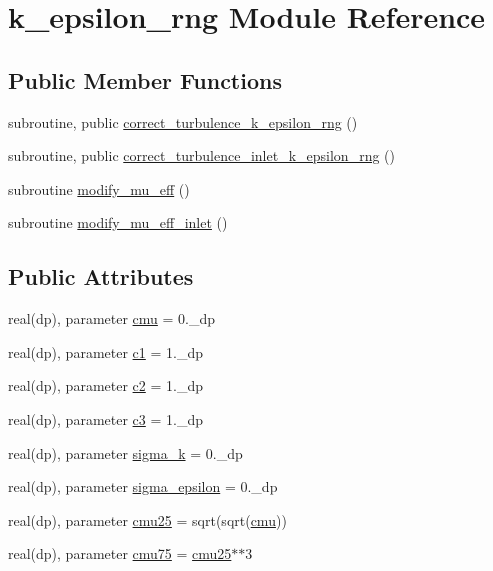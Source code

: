 \hypertarget{classk__epsilon__rng}{\section{k\-\_\-epsilon\-\_\-rng Module Reference}
\label{classk__epsilon__rng}
}
\subsection*{Public Member Functions}
\begin{DoxyCompactItemize}
\item 
subroutine, public \hyperlink{classk__epsilon__rng_aead60a1e254021f3eccd9fd8a7b74352}{correct\-\_\-turbulence\-\_\-k\-\_\-epsilon\-\_\-rng} ()
\item 
subroutine, public \hyperlink{classk__epsilon__rng_a26639f5f7047e9c797b92d7383543509}{correct\-\_\-turbulence\-\_\-inlet\-\_\-k\-\_\-epsilon\-\_\-rng} ()
\item 
subroutine \hyperlink{classk__epsilon__rng_a9b6328ba57554ef905a83eaa444b8d83}{modify\-\_\-mu\-\_\-eff} ()
\item 
subroutine \hyperlink{classk__epsilon__rng_ac9112e6bf146afd6c79028a23415676c}{modify\-\_\-mu\-\_\-eff\-\_\-inlet} ()
\end{DoxyCompactItemize}
\subsection*{Public Attributes}
\begin{DoxyCompactItemize}
\item 
real(dp), parameter \hyperlink{classk__epsilon__rng_a6b241c19c45ed08f9aa1f0a7e03b53d7}{cmu} = 0.\-\_\-dp
\item 
real(dp), parameter \hyperlink{classk__epsilon__rng_ad50599dfea881408b5cf48539f9ad517}{c1} = 1.\-\_\-dp
\item 
real(dp), parameter \hyperlink{classk__epsilon__rng_a6a8f83178b54a12ab8bb88a8f87e4742}{c2} = 1.\-\_\-dp
\item 
real(dp), parameter \hyperlink{classk__epsilon__rng_a60edd75f1fe3c0814506d06a17b7236a}{c3} = 1.\-\_\-dp
\item 
real(dp), parameter \hyperlink{classk__epsilon__rng_a5acd8d27794527d80376d8dc66a15c80}{sigma\-\_\-k} = 0.\-\_\-dp
\item 
real(dp), parameter \hyperlink{classk__epsilon__rng_ad605a3725a59c2b4c42212222e9b8f0e}{sigma\-\_\-epsilon} = 0.\-\_\-dp
\item 
real(dp), parameter \hyperlink{classk__epsilon__rng_ad5f3f150214e5954d1b25097db147625}{cmu25} = sqrt(sqrt(\hyperlink{classk__epsilon__rng_a6b241c19c45ed08f9aa1f0a7e03b53d7}{cmu}))
\item 
real(dp), parameter \hyperlink{classk__epsilon__rng_aa8cce766b4ed7f38a8e55945cee9c659}{cmu75} = \hyperlink{classk__epsilon__rng_ad5f3f150214e5954d1b25097db147625}{cmu25}$\ast$$\ast$3
\end{DoxyCompactItemize}

